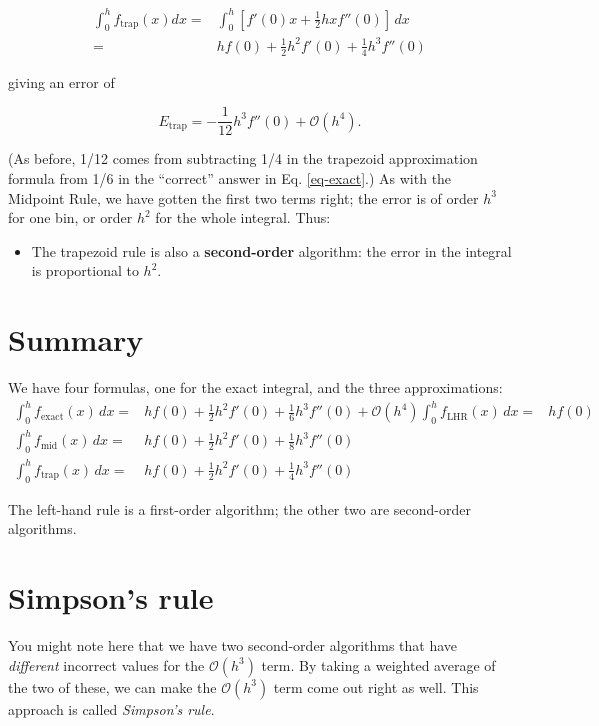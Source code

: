 \documentclass[12ampt]{article}   %
\begin{document}
\begin{align}
  \int_0^h f_{\mathrm{trap}}(x) dx =& \int_0^h \left[f'(0)x + \frac{1}{2}hxf''(0)\right] \, dx \\
     =& hf(0) + \frac{1}{2}h^2 f'(0) + \frac{1}{4} h^3 f''(0)
\end{align}

giving an error of

\begin{equation}
    E_{\mathrm{trap}}=-\frac{1}{12} h^3 f''(0) + \mathcal O(h^4).
\end{equation}

(As before, 1/12 comes from subtracting 1/4 in the trapezoid approximation formula from 1/6 in the ``correct'' answer in Eq. \ref{eq-exact}.)
As with the Midpoint Rule, we have gotten the first two terms right; the error is of order $h^3$ for one bin, or order $h^2$ for the whole integral. Thus:

\begin{itemize}
      \item{The trapezoid rule is also a {\bf second-order} algorithm: the error in the integral is proportional to $h^2$.}
 \end{itemize}



 \section{Summary}

 We have four formulas, one for the exact integral, and the three approximations:
 \begin{align}
   \int_0^h f_{\mathrm{exact}}(x)\, dx=& hf(0) + \frac{1}{2}h^2f'(0) + \frac{1}{6} h^3 f''(0) + \mathcal O(h^4) 
 \int_0^h f_{\mathrm{LHR}}(x)\, dx =& hf(0) \\
 \int_0^h f_{\mathrm{mid}}(x)\, dx =& hf(0) + \frac{1}{2}h^2 f'(0) + \frac{1}{8} h^3 f''(0)\\ 
 \int_0^h f_{\mathrm{trap}}(x)\, dx =& hf(0) + \frac{1}{2}h^2 f'(0) + \frac{1}{4} h^3 f''(0)
 \end{align}

 The left-hand rule is a first-order algorithm; the other two are second-order algorithms.

 \section{Simpson's rule}

 You might note here that we have two second-order algorithms that have {\it different} incorrect values for the $\mathcal O(h^3)$ term. By taking a weighted average of the two of these, we can
 make the $\mathcal O(h^3)$ term come out right as well. This approach is called {\it Simpson's rule}.
\end{document}
